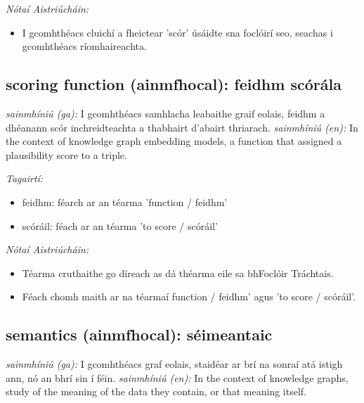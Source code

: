 \documentclass{article}
\begin{document}
 \noindent \textit{Nótaí Aistriúcháin:}
\begin{itemize}
	\item I gcomhthéacs cluichí a fheictear 'scór' úsáidte sna foclóirí seo, seachas i gcomhthéacs ríomhaireachta.
\end{itemize}


\subsection*{scoring function (ainmfhocal): feidhm scórála} 
 \noindent \textit{sainmhíniú (ga):} I gcomhthéacs samhlacha leabaithe graif eolais, feidhm a dhéanann scór inchreidteachta a thabhairt d'abairt thriarach.
\newline\newline
 \noindent \textit{sainmhíniú (en):} In the context of knowledge graph embedding models, a function that assigned a plausibility score to a triple.
\newline

 \noindent \textit{Tagairtí:}
\begin{itemize}
	\item feidhm: féarch ar an téarma 'function / feidhm'
	\item scóráil: féach ar an téarma 'to score / scóráil'
\end{itemize}

 \noindent \textit{Nótaí Aistriúcháin:}
\begin{itemize}
	\item Téarma cruthaithe go díreach as dá théarma eile sa bhFoclóir Tráchtais.
	\item Féach chomh maith ar na téarmaí function / feidhm' agus 'to score / scóráil'.
\end{itemize}


\subsection*{semantics (ainmfhocal): séimeantaic} 
 \noindent \textit{sainmhíniú (ga):} I gcomhthéacs graf eolais, staidéar ar brí na sonraí atá istigh ann, nó an bhrí sin í féin.
\newline\newline
 \noindent \textit{sainmhíniú (en):} In the context of knowledge graphs, study of the meaning of the data they contain, or that meaning itself.
\newline
\end{document}
